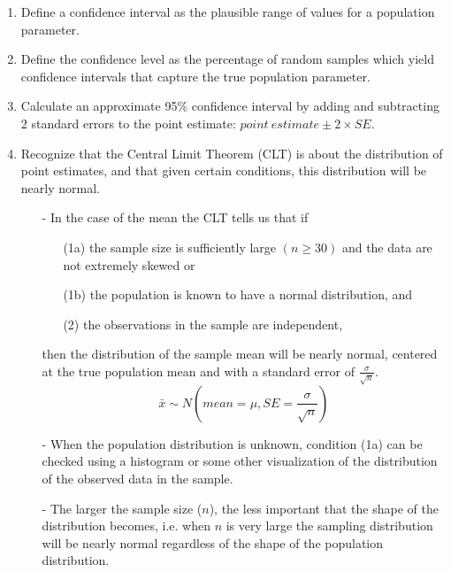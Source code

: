 \documentclass[11pt]{article}
\begin{document}
%

\vspace{0.5cm}

%

\begin{enumerate}[resume]
\renewcommand\labelenumi{\textcolor{light}{\textbf{LO \theenumi.}}}

\item Define a confidence interval as the plausible range of values for a population parameter.

\item Define the confidence level as the percentage of random samples which yield confidence intervals that capture the true population parameter.

\item Calculate an approximate 95\% confidence interval by adding and subtracting 2 standard errors to the point estimate: $point~estimate \pm 2 \times SE$.

\item Recognize that the Central Limit Theorem (CLT) is about the distribution of point estimates, and that given certain conditions, this distribution will be nearly normal.
\begin{itemize}
\item[-] In the case of the mean the CLT tells us that if
\begin{itemize}[parsep=0pt]
\item[(1a)] the sample size is sufficiently large $(n \ge 30)$ and the data are not extremely skewed or
\item[(1b)] the population is known to have a normal distribution, and
\item[(2)] the observations in the sample are independent,
\end{itemize}
then the distribution of the sample mean will be nearly normal, centered at the true population mean and with a standard error of $\frac{\sigma}{\sqrt{n}}$.
\[ \bar{x} \sim N \left( mean = \mu, SE = \frac{\sigma}{\sqrt{n}} \right) \]
\item[-] When the population distribution is unknown, condition (1a) can be checked using a histogram or some other visualization of the distribution of the observed data in the sample.
\item[-] The larger the sample size ($n$), the less important that the shape of the distribution becomes, i.e. when $n$ is very large the sampling distribution will be nearly normal regardless of the shape of the population distribution.
\end{itemize}


\end{enumerate}
\end{document}
